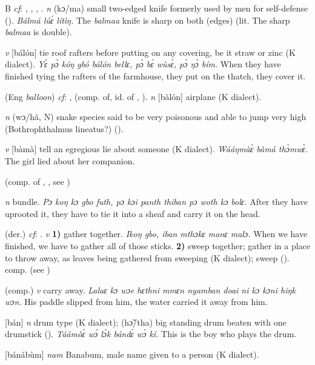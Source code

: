 \begin{letter}{B}
 \textit{cf}: , , , . \textit{n} (kɔ/ma) small two-edged knife formerly used by men for self-defense (\citealt{Pichl1967}). \textit{Bálmá lúɛ́ lítìŋ.} The \textit{balmaa} knife is sharp on both (edges) (lit. The sharp \textit{balmaa} is double).

 \textit{v} [bálón] tie roof rafters before putting on any covering, be it straw or zinc (K dialect). \textit{Yɛ̀ pɔ̀ kóŋ gbó bálón bellɛ, pɔ̀ bɛ́ wùsɛ̀, pɔ̀ ŋɔ̀ bím.} When they have finished tying the rafters of the farmhouse, they put on the thatch, they cover it.

 (Eng \textit{balloon}) \textit{cf}: ,  (comp. of, id. of , ). \textit{n} [bàlón] airplane (K dialect). 

 \textit{n} (wɔ/hã, N) snake species said to be very poisonous and able to jump very high (Bothrophthalmus lineatus?) (\citealt{Pichl1967}). 

 \textit{v} [bàmà] tell an egregious lie about someone (K dialect). \textit{Wááŋmàɛ̀ bàmá thɔ̀mwɛ̀.} The girl lied about her companion.

 (comp. of , , see )

 \textit{n} bundle. \textit{Pɔ koŋ kɔ gbo futh, pɔ kɔi panth thiban pɔ woth kɔ bolɛ.} After they have uprooted it, they have to tie it into a sheaf and carry it on the head. 

 (der.) \textit{cf}: . \textit{v} \textbf{1)} gather together. \textit{Ikoŋ gbo, iban mthɔkɛ manɛ malɔ.} When we have finished, we have to gather all of those sticks. \textbf{2)} sweep together; gather in a place to throw away, as leaves being gathered from sweeping (K dialect); sweep (\citealt{Pichl1967}).   comp.  (see )

 (comp.) \textit{v} carry away. \textit{Lalaɛ kɔ wɔe hɛthni mmɛn nyamban doai ni kɔ kɔni hiŋk wɔn.} His paddle slipped from him, the water carried it away from him.

 [bán] \textit{n} drum type (K dialect); (hɔ̃/tha) big standing drum beaten with one drumstick (\citealt{Pichl1967}). \textit{Táámòɛ̀ wɔ́ lɔ́k bándɛ̀ wɔ̀ kí.} This is the boy who plays the drum. 

 [bánábùm] \textit{nam} Banabum, male name given to a person (K dialect).


\end{letter}
